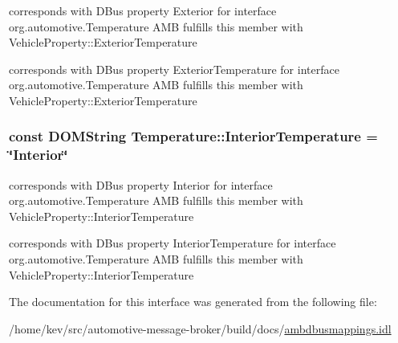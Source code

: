 corresponds with D\+Bus property Exterior for interface org.\+automotive.\+Temperature A\+M\+B fulfills this member with Vehicle\+Property\+::\+Exterior\+Temperature 

corresponds with D\+Bus property Exterior\+Temperature for interface org.\+automotive.\+Temperature A\+M\+B fulfills this member with Vehicle\+Property\+::\+Exterior\+Temperature \hypertarget{interfaceTemperature_aa5249b5e464e788f5d4f1b2614c5be54}{
\subsubsection[{Interior\+Temperature}]{\setlength{\rightskip}{0pt plus 5cm}const D\+O\+M\+String Temperature\+::\+Interior\+Temperature = \char`\"{}Interior\char`\"{}}}\label{interfaceTemperature_aa5249b5e464e788f5d4f1b2614c5be54}


corresponds with D\+Bus property Interior for interface org.\+automotive.\+Temperature A\+M\+B fulfills this member with Vehicle\+Property\+::\+Interior\+Temperature 

corresponds with D\+Bus property Interior\+Temperature for interface org.\+automotive.\+Temperature A\+M\+B fulfills this member with Vehicle\+Property\+::\+Interior\+Temperature 

The documentation for this interface was generated from the following file\+:\begin{DoxyCompactItemize}
\item 
/home/kev/src/automotive-\/message-\/broker/build/docs/\hyperlink{ambdbusmappings_8idl}{ambdbusmappings.\+idl}\end{DoxyCompactItemize}
